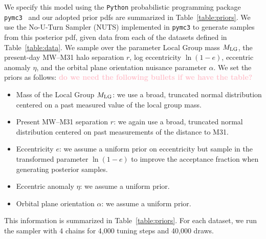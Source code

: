 \documentclass[twocolumn]{aastex631}
\newcommand{\kc}[1]{\textcolor{pink}{\textbf{#1}} }
\newcommand{\mlg}{\ensuremath{M_{\rm LG}}}
\begin{document}
We specify this model using the \texttt{Python} probabilistic programming
package \texttt{pymc3}~\citep{Salvatier2016} and our adopted prior pdfs are
summarized in Table~\ref{table:priors}.
We use the No-U-Turn Sampler (NUTS) \citep{Homan2014} implemented in
\texttt{pymc3} to generate samples from this posterior pdf, given data from each
of the datasets defined in Table~\ref{table:data}.
We sample over the parameter Local Group mass $\mlg$, the present-day MW--M31 halo
separation $r$, log eccentricity $\ln\left(1 - e\right)$, eccentric anomaly
$\eta$, and the orbital plane orientation nuisance parameter $\alpha$.
We set the priors as follows:
\kc{do we need the following bullets if we have the table?}
\begin{itemize}
  \item Mass of the Local Group $\mlg$: we use a broad, truncated normal
  distribution centered on a past measured value of the local group mass.
  \item Present MW--M31 separation $r$: we again use a broad, truncated normal
  distribution centered on past measurements of the distance to M31.
  \item Eccentricity $e$: we assume a uniform prior on eccentricity but sample
  in the transformed parameter $\ln(1-e)$ to improve the acceptance fraction
  when generating posterior samples.
  \item Eccentric anomaly $\eta$: we assume a uniform prior.
  \item Orbital plane orientation $\alpha$: we assume a uniform prior.
\end{itemize}
This information is summarized in Table~\ref{table:priors}. 
For each dataset, we run the sampler with 4 chains for 4,000 tuning steps and
40,000 draws.

\end{document}
